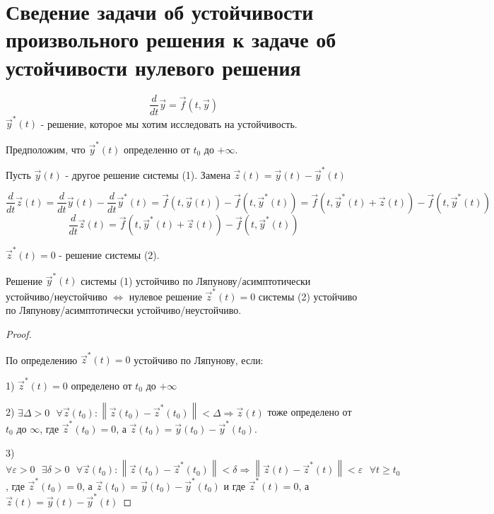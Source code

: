 \documentclass[12pt, a4paper]{report}
\begin{document}
\fi


\section{Сведение задачи  об устойчивости  произвольного решения к задаче об устойчивости нулевого решения}

\[ \frac{d}{dt }  \vec{y} = \vec{f } (t, \vec{y} ) \tag{1}  \] 
\( \vec{y} ^{* } (t) \)  - решение, которое мы хотим исследовать на устойчивость. 

Предположим, что \( \vec{y } ^* (t) \) определенно от \( t_0 \) до \( +\infty  \).

Пусть \( \vec{y} (t) \)  - другое решение системы (1). Замена \( \vec{z }(t )= \vec{y } (t) - \vec{y }^{* } (t)   \) 

\[ \frac{d}{dt }  \vec{z } (t ) = \frac{d}{dt }  \vec{y} (t )- \frac{d}{dt }  \vec{y } ^*   (t ) = \vec{f } (t, \vec{y} (t))-\vec{f } (t, \vec{y } ^{* } (t)) =  \vec{f } (t, \vec{y}^* (t) +\vec{z } (t))-\vec{f } (t, \vec{y } ^{* } (t))\] 
\[ \frac{d}{dt }\vec{z } (t) =   \vec{f } (t, \vec{y}^* (t) +\vec{z } (t))-\vec{f } (t, \vec{y } ^{* } (t)) \tag{2} \] 

\( \vec{z } ^{* } (t) = 0\)  - решение системы (2). 

\begin{theorem}
    Решение \( \vec{y } ^{* } (t) \)  системы (1) устойчиво по Ляпунову/асимптотически устойчиво/неустойчиво \( \Leftrightarrow  \) нулевое решение \( \vec{z } ^{* } (t) = 0 \) системы (2) устойчиво по Ляпунову/асимптотически устойчиво/неустойчиво. 
\end{theorem}

\begin{proof} \(  \) 

По определению \( \vec{z } ^*   (t ) = 0 \) устойчиво по Ляпунову, если: 

1) \( \vec{z } ^* (t) = 0 \) определено от \( t_0 \) до \( +\infty  \) 

2) \( \exists  \Delta > 0 \text{ }  \forall  \vec{z } (t_0): \left\lVert  \vec{z } (t_0 )- \vec{z } ^* (t_0 ) \right\rVert < \Delta \Rightarrow \vec{z } (t) \) тоже определено от \( t_0 \) до \( \infty  \), где \( \vec{z} ^{* } (t_0 )= 0  \), а \( \vec{z } (t_0 )  = \vec{y } (t_0 )- \vec{y } ^* (t_0) \).

3) \( \forall  \varepsilon > 0 \text{ } \exists  \delta > 0  \text{ }  \forall  \vec{z } (t_0) : \left\lVert \vec{z } (t_0 ) - \vec{z } ^* (t_0 ) \right\rVert < \delta \Rightarrow \left\lVert \vec{z } (t ) - \vec{z } ^* (t) \right\rVert < \varepsilon \text{ }  \forall  t \ge  t_0 \), где   \( \vec{z} ^{* } (t_0 )= 0  \), а \( \vec{z } (t_0 )  = \vec{y } (t_0 )- \vec{y } ^* (t_0) \) и  где \( \vec{z} ^{* } (t )= 0  \), а \( \vec{z } (t)  = \vec{y } (t )- \vec{y } ^* (t) \)

\end{proof}
\end{document}
